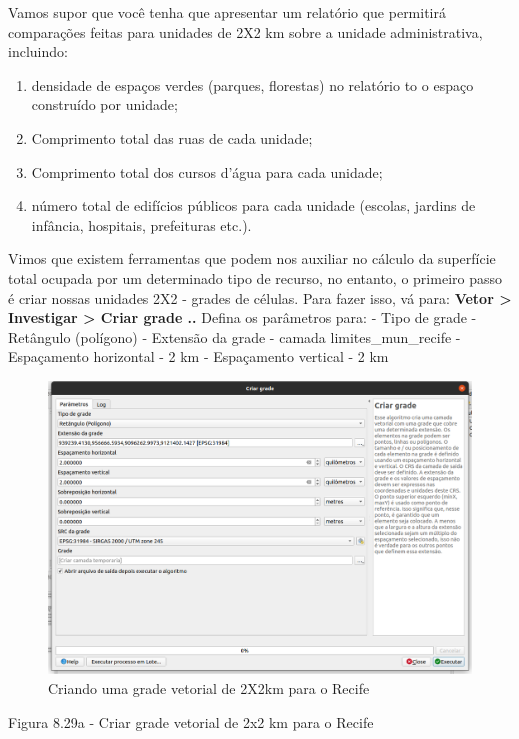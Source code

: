 \documentclass[
  portuguese,
]{krantz}
\providecommand{\tightlist}{%
  \setlength{\itemsep}{0pt}\setlength{\parskip}{0pt}}
\begin{document}
Vamos supor que você tenha que apresentar um relatório que permitirá comparações feitas para unidades de 2X2 km sobre a unidade administrativa, incluindo:

\begin{enumerate}
\def\labelenumi{\arabic{enumi}.}
\tightlist
\item
  densidade de espaços verdes (parques, florestas) no relatório to o espaço construído por unidade;
\item
  Comprimento total das ruas de cada unidade;
\item
  Comprimento total dos cursos d'água para cada unidade;
\item
  número total de edifícios públicos para cada unidade (escolas, jardins de infância, hospitais, prefeituras etc.).
\end{enumerate}

Vimos que existem ferramentas que podem nos auxiliar no cálculo da superfície total ocupada por um determinado tipo de recurso, no entanto, o primeiro passo é criar nossas unidades 2X2 - grades de células. Para fazer isso, vá para: \textbf{Vetor \textgreater{} Investigar \textgreater{} Criar grade ..} Defina os parâmetros para:
- Tipo de grade - Retângulo (polígono)
- Extensão da grade - camada limites\_mun\_recife
- Espaçamento horizontal - 2 km
- Espaçamento vertical - 2 km

\begin{figure}
\centering
\includegraphics{media/modulo8/fig829_a.png}
\caption{Criando uma grade vetorial de 2X2km para o Recife}
\end{figure}

Figura 8.29a - Criar grade vetorial de 2x2 km para o Recife
\end{document}
